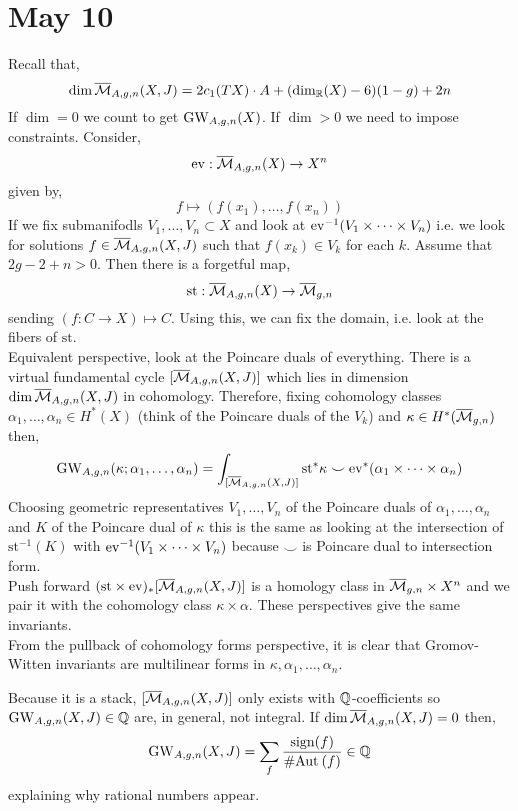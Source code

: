 \documentclass[12pt]{article}
\begin{document}
\section{May 10}

\newcommand{\st}{\mathrm{st}}

Recall that,
\[ \dim{\overline{\mathcal{M}}_{A,g,n}(X,J)} = 2 c_1(T X) \cdot A + (\dim_{\mathbb{R}}(X) - 6)(1-g) + 2 n \]
If $\dim = 0$ we count to get $\mathrm{GW}_{A,g,n}(X)$. If $\dim > 0$ we need to impose constraints. Consider,
\[ \mathrm{ev} : \overline{\mathcal{M}}_{A,g,n}(X) \to X^n \]
given by,
\[ f \mapsto (f(x_1), \dots, f(x_n)) \]
If we fix submanifodls $V_1, \dots, V_n \subset X$ and look at $\mathrm{ev}^{-1}(V_1 \times \cdots \times V_n)$ i.e. we look for solutions $f \in \overline{\mathcal{M}}_{A,g,n}(X, J)$ such that $f(x_k) \in V_k$ for each $k$. Assume that $2g - 2 + n > 0$. Then there is a forgetful map,
\[ \st : \Mbar_{A,g,n}(X) \to \Mbar_{g,n} \]
sending $(f : C \to X) \mapsto C$. Using this, we can fix the domain, i.e. look at the fibers of $\st$.
\bigskip\\
Equivalent perspective, look at the Poincare duals of everything. There is a virtual fundamental cycle $[\overline{\mathcal{M}}_{A,g,n}(X,J)]$ which lies in dimension $\dim{\overline{\mathcal{M}}_{A,g,n}(X,J)}$ in cohomology. Therefore, fixing cohomology classes $\alpha_1, \dots, \alpha_n \in H^*(X)$ (think of the Poincare duals of the $V_k$) and $\kappa \in H^*(\overline{\mathcal{M}}_{g,n})$ then,
\[ \GW_{A,g,n}(\kappa ; \alpha_1, \dots, \alpha_n) = \int_{[ \Mbar_{A,g,n}(X, J)]} \st^* \kappa \smile \ev^* (\alpha_1 \times \cdots \times \alpha_n) \] 
Choosing geometric representatives $V_1, \dots, V_n$ of the Poincare duals of $\alpha_1, \dots, \alpha_n$ and $K$ of the Poincare dual of $\kappa$ this is the same as looking at the intersection of $\st^{-1}(K)$ with $\mathrm{ev}^{-1}(V_1 \times \cdots \times V_n)$ because $\smile$ is Poincare dual to intersection form. 
\bigskip\\
Push forward $(\st \times \ev)_* [\Mbar_{A,g,n}(X,J)]$ is a homology class in $\overline{\mathcal{M}}_{g,n} \times X^n$ and we pair it with the cohomology class $\kappa \times \alpha$. These perspectives give the same invariants. 
\bigskip\\
From the pullback of cohomology forms perspective, it is clear that Gromov-Witten invariants are multilinear forms in $\kappa, \alpha_1, \dots, \alpha_n$. 

\begin{rmk}
Because it is a stack, $[\overline{\mathcal{M}}_{A,g,n}(X,J)]$ only exists with $\mathbb{Q}$-coefficients so $\mathrm{GW}_{A,g,n}(X, J) \in \mathbb{Q}$ are, in general, not integral. If $\dim{\overline{\mathcal{M}}_{A,g,n}(X,J)} = 0$ then,
\[ \mathrm{GW}_{A,g,n}(X,J) = \sum_{f} \frac{\mathrm{sign}(f)}{\# \mathrm{Aut}_{} \left( f \right)} \in \mathbb{Q} \]
explaining why rational numbers appear. 
\end{rmk}
\end{document}
